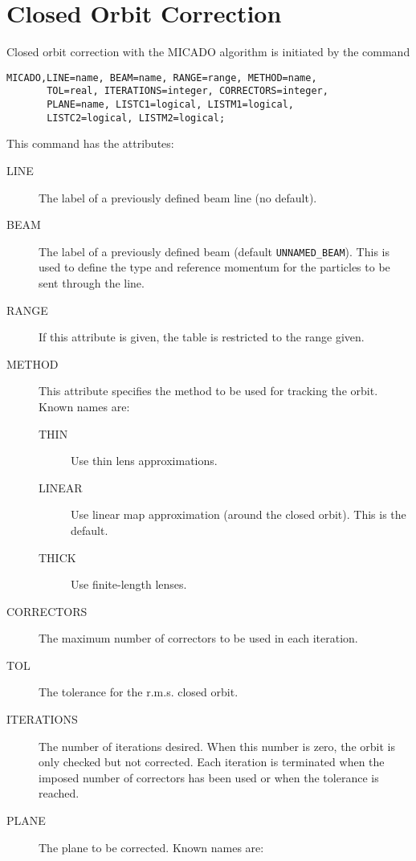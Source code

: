 \section{Closed Orbit Correction}
\label{sec:micado}
Closed orbit correction with the MICADO algorithm is initiated by the command 
\begin{verbatim}
MICADO,LINE=name, BEAM=name, RANGE=range, METHOD=name,
       TOL=real, ITERATIONS=integer, CORRECTORS=integer,
       PLANE=name, LISTC1=logical, LISTM1=logical,
       LISTC2=logical, LISTM2=logical;
\end{verbatim}
This command has the attributes:
\begin{description}
\item[LINE]
  The label of a previously defined beam line (no default).
\item[BEAM]
  The label of a previously defined beam (default \texttt{UNNAMED\_BEAM}).
  This is used to define the type and reference momentum for the
  particles to be sent through the line.
\item[RANGE]
  If this attribute is given, the table is restricted to the range given.
\item[METHOD]
  This attribute specifies the method to be used for tracking the orbit.
  Known names are:
  \begin{description}
  \item[THIN]
    Use thin lens approximations.
  \item[LINEAR]
    Use linear map approximation (around the closed orbit).
    This is the default.
  \item[THICK]
    Use finite-length lenses.
  \end{description}
\item[CORRECTORS]
  The maximum number of correctors to be used in each iteration.
\item[TOL]
  The tolerance for the r.m.s. closed orbit.
\item[ITERATIONS]
  The number of iterations desired.
  When this number is zero,
  the orbit is only checked but not corrected.
  Each iteration is terminated when the imposed number of correctors has been
  used or when the tolerance is reached.
\item[PLANE]
  The plane to be corrected.
  Known names are:

\end{description}
